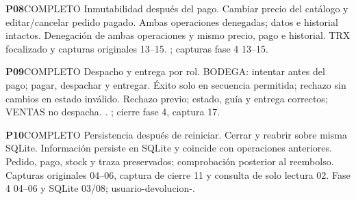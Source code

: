 \par\medskip\noindent\begin{minipage}{\linewidth}
\noindent\textbf{\large P08}\quad\textsf{COMPLETO}
 Inmutabilidad después del pago.
 Cambiar precio del catálogo y editar/cancelar pedido pagado.
 Ambas operaciones denegadas; datos e historial intactos.
 Denegación de ambas operaciones y mismo precio, pago e historial.
 TRX focalizado y capturas originales 13–15. ; capturas fase 4 13–15.
\end{minipage}\par
\par\medskip\noindent\begin{minipage}{\linewidth}
\noindent\textbf{\large P09}\quad\textsf{COMPLETO}
 Despacho y entrega por rol.
 BODEGA: intentar antes del pago; pagar, despachar y entregar.
 Éxito solo en secuencia permitida; rechazo sin cambios en estado inválido.
 Rechazo previo; estado, guía y entrega correctos; VENTAS no despacha.
 . ; cierre fase 4, captura 17.
\end{minipage}\par
\par\medskip\noindent\begin{minipage}{\linewidth}
\noindent\textbf{\large P10}\quad\textsf{COMPLETO}
 Persistencia después de reiniciar.
 Cerrar y reabrir sobre misma SQLite.
 Información persiste en SQLite y coincide con operaciones anteriores.
 Pedido, pago, stock y traza preservados; comprobación posterior al reembolso.
 Capturas originales 04–06, captura de cierre 11 y consulta de solo lectura 02. Fase 4 04–06 y SQLite 03/08; usuario-devolucion-.
\end{minipage}\par
